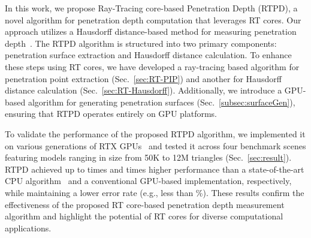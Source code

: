 In this work, we propose Ray-Tracing core-based Penetration Depth (RTPD), a novel algorithm for penetration depth computation that leverages RT cores.
Our approach utilizes a Hausdorff distance-based method for measuring penetration depth~\cite{SIG09HIST}.
The RTPD algorithm is structured into two primary components: penetration surface extraction and Hausdorff distance calculation.
To enhance these steps using RT cores, we have developed a ray-tracing based algorithm for penetration point extraction (Sec.~\ref{sec:RT-PIP}) and another for Hausdorff distance calculation (Sec.~\ref{sec:RT-Hausdorff}).
Additionally, we introduce a GPU-based algorithm for generating penetration surfaces (Sec.~\ref{subsec:surfaceGen}), ensuring that RTPD operates entirely on GPU platforms.

To validate the performance of the proposed RTPD algorithm, we implemented it on various generations of RTX GPUs~\cite{thoman2022multi} and tested it across four benchmark scenes featuring models ranging in size from 50K to 12M triangles (Sec.~\ref{sec:result}).
RTPD achieved up to  times and  times higher performance than a state-of-the-art CPU algorithm~\cite{zheng2022economic} and a conventional GPU-based implementation, respectively, while maintaining a lower error rate (e.g., less than \%).
These results confirm the effectiveness of the proposed RT core-based penetration depth measurement algorithm and highlight the potential of RT cores for diverse computational applications.
